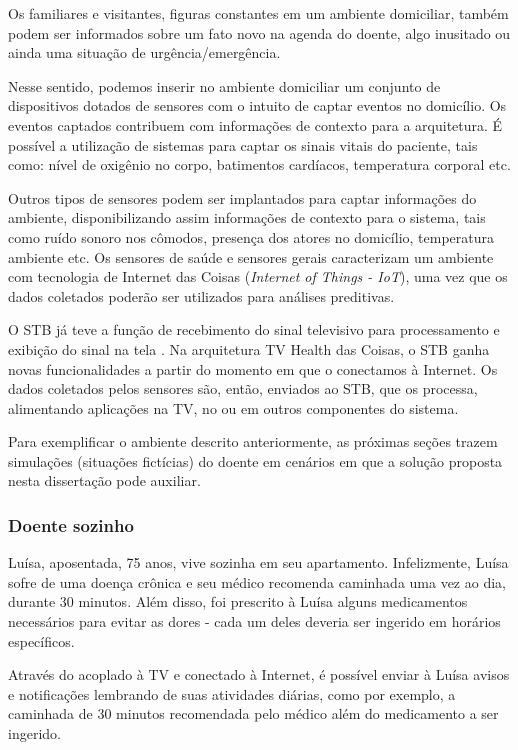 Os familiares e visitantes, figuras constantes em um ambiente domiciliar, também
podem ser informados sobre um fato novo na agenda do doente, algo inusitado ou 
ainda uma situação de urgência/emergência.

Nesse sentido, podemos inserir no ambiente domiciliar um conjunto de
dispositivos dotados de sensores com o intuito de captar eventos no domicílio. 
Os eventos captados contribuem com informações de contexto para a arquitetura.
É possível a utilização de sistemas para captar os sinais vitais do paciente, tais
como: nível de oxigênio no corpo, batimentos cardíacos, temperatura corporal etc.

Outros tipos de sensores podem ser implantados para captar informações do
ambiente, disponibilizando assim informações de contexto para o sistema,  tais
como ruído sonoro nos cômodos, presença dos atores no domicílio, temperatura
ambiente etc. Os sensores de saúde e sensores gerais caracterizam um ambiente 
com tecnologia de Internet das Coisas (\textit{Internet of Things  - IoT}), uma
vez que os dados coletados poderão ser utilizados para análises preditivas.

O STB já teve a função de recebimento do sinal televisivo para processamento e
exibição do sinal na tela \cite{projetometal}. Na arquitetura TV Health das
Coisas, o STB ganha novas funcionalidades a partir do momento em que o
conectamos à Internet. Os dados coletados pelos sensores são, então, enviados
ao STB, que os processa, alimentando aplicações na TV, no \smartphone[] ou em
outros componentes do sistema.

Para exemplificar o ambiente descrito anteriormente, as próximas seções
trazem simulações (situações fictícias) do doente em cenários em que a solução
proposta nesta dissertação pode auxiliar.
\label{subsubsec:simulacoes-A}

\subsubsection{Doente sozinho}

Luísa, aposentada, 75 anos, vive sozinha em seu apartamento. Infelizmente,
Luísa sofre de uma doença crônica e seu médico recomenda caminhada uma vez ao
dia, durante 30 minutos.  Além disso, foi prescrito à Luísa alguns medicamentos
necessários para evitar as dores - cada um deles deveria ser ingerido em
horários específicos.

Através do \stb[] acoplado à TV e conectado à Internet, é
possível enviar à Luísa avisos e notificações lembrando de suas atividades
diárias, como por exemplo, a caminhada de 30 minutos recomendada pelo
médico além do medicamento a ser ingerido.

